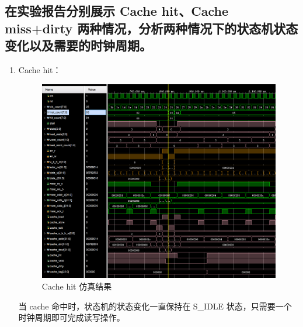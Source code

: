 \documentclass{article}
\begin{document}
\subsection{在实验报告分别展示 Cache hit、Cache miss+dirty 两种情况，分析两种情况下的状态机状态变化以及需要的时钟周期。}
\begin{enumerate}
    \item Cache hit：\par
    \begin{figure}[h]
        \centering
        \includegraphics[width=1\textwidth]{images/cache_hit.png}
        \caption{Cache hit 仿真结果}
        \label{fig:cache_hit}
    \end{figure}
    当 cache 命中时，状态机的状态变化一直保持在 S\_IDLE 状态，只需要一个时钟周期即可完成读写操作。\par
    

\end{enumerate}
\end{document}
